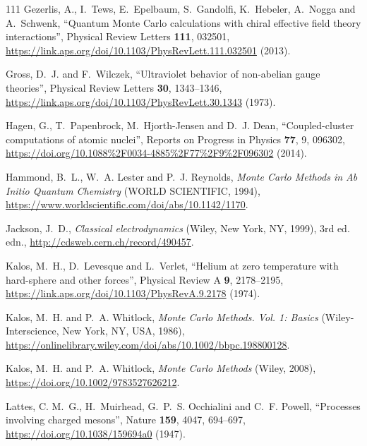 \documentclass[12pt,letterpaper,UTF8]{report}
\begin{document}
{\begin{thebibliography}{111}
Gezerlis, A., I.~Tews, E.~Epelbaum, S.~Gandolfi, K.~Hebeler, A.~Nogga and
  A.~Schwenk, \enquote{Quantum {Monte} {Carlo} calculations with chiral
  effective field theory interactions}, Physical Review Letters \textbf{111},
  032501,
  \urlprefix\url{https://link.aps.org/doi/10.1103/PhysRevLett.111.032501}
  (2013).

Gross, D.~J. and F.~Wilczek, \enquote{Ultraviolet behavior of non-abelian gauge
  theories}, Physical Review Letters \textbf{30}, 1343--1346,
  \urlprefix\url{https://link.aps.org/doi/10.1103/PhysRevLett.30.1343} (1973).

Hagen, G., T.~Papenbrock, M.~Hjorth-Jensen and D.~J. Dean,
  \enquote{Coupled-cluster computations of atomic nuclei}, Reports on Progress
  in Physics \textbf{77}, 9, 096302,
  \urlprefix\url{https://doi.org/10.1088%2F0034-4885%2F77%2F9%2F096302} (2014).

Hammond, B.~L., W.~A. Lester and P.~J. Reynolds, \emph{{Monte} {Carlo} Methods
  in Ab Initio Quantum Chemistry} (WORLD SCIENTIFIC, 1994),
  \urlprefix\url{https://www.worldscientific.com/doi/abs/10.1142/1170}.

Jackson, J.~D., \emph{Classical electrodynamics} (Wiley, New York, {NY}, 1999),
  3rd ed. edn., \urlprefix\url{http://cdsweb.cern.ch/record/490457}.

Kalos, M.~H., D.~Levesque and L.~Verlet, \enquote{Helium at zero temperature
  with hard-sphere and other forces}, Physical Review A \textbf{9}, 2178--2195,
  \urlprefix\url{https://link.aps.org/doi/10.1103/PhysRevA.9.2178} (1974).

Kalos, M.~H. and P.~A. Whitlock, \emph{{Monte} {Carlo} Methods. Vol. 1: Basics}
  (Wiley-Interscience, New York, NY, USA, 1986),
  \urlprefix\url{https://onlinelibrary.wiley.com/doi/abs/10.1002/bbpc.198800128}.

Kalos, M.~H. and P.~A. Whitlock, \emph{{Monte} {Carlo} Methods} (Wiley, 2008),
  \urlprefix\url{https://doi.org/10.1002/9783527626212}.

Lattes, C. M.~G., H.~Muirhead, G.~P.~S. Occhialini and C.~F. Powell,
  \enquote{Processes involving charged mesons}, Nature \textbf{159}, 4047,
  694--697, \urlprefix\url{https://doi.org/10.1038/159694a0} (1947).


\end{thebibliography}}
\end{document}
